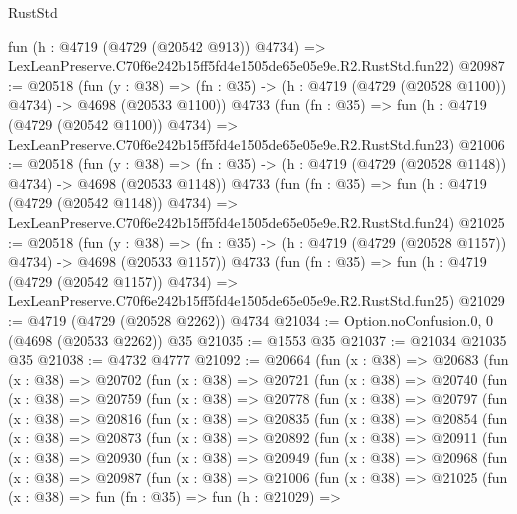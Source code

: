 \begin{lexlean}{RustStd}
\begin{coremodule}
    fun (h : @4719 (@4729 (@20542 @913)) @4734) =>
    LexLeanPreserve.C70f6e242b15ff5fd4e1505de65e05e9e.R2.RustStd.fun22)
@20987 := @20518
    (fun (y : @38) =>
    (fn : @35) -> (h : @4719 (@4729 (@20528 @1100)) @4734) -> @4698 (@20533 @1100))
    @4733
    (fun (fn : @35) =>
    fun (h : @4719 (@4729 (@20542 @1100)) @4734) =>
    LexLeanPreserve.C70f6e242b15ff5fd4e1505de65e05e9e.R2.RustStd.fun23)
@21006 := @20518
    (fun (y : @38) =>
    (fn : @35) -> (h : @4719 (@4729 (@20528 @1148)) @4734) -> @4698 (@20533 @1148))
    @4733
    (fun (fn : @35) =>
    fun (h : @4719 (@4729 (@20542 @1148)) @4734) =>
    LexLeanPreserve.C70f6e242b15ff5fd4e1505de65e05e9e.R2.RustStd.fun24)
@21025 := @20518
    (fun (y : @38) =>
    (fn : @35) -> (h : @4719 (@4729 (@20528 @1157)) @4734) -> @4698 (@20533 @1157))
    @4733
    (fun (fn : @35) =>
    fun (h : @4719 (@4729 (@20542 @1157)) @4734) =>
    LexLeanPreserve.C70f6e242b15ff5fd4e1505de65e05e9e.R2.RustStd.fun25)
@21029 := @4719 (@4729 (@20528 @2262)) @4734
@21034 := Option.noConfusion.{0, 0} (@4698 (@20533 @2262)) @35
@21035 := @1553 @35
@21037 := @21034 @21035 @35
@21038 := @4732 @4777
@21092 := @20664
    (fun (x : @38) =>
    @20683
      (fun (x : @38) =>
      @20702
        (fun (x : @38) =>
        @20721
          (fun (x : @38) =>
          @20740
            (fun (x : @38) =>
            @20759
              (fun (x : @38) =>
              @20778
                (fun (x : @38) =>
                @20797
                  (fun (x : @38) =>
                  @20816
                    (fun (x : @38) =>
                    @20835
                      (fun (x : @38) =>
                      @20854
                        (fun (x : @38) =>
                        @20873
                          (fun (x : @38) =>
                          @20892
                            (fun (x : @38) =>
                            @20911
                              (fun (x : @38) =>
                              @20930
                                (fun (x : @38) =>
                                @20949
                                  (fun (x : @38) =>
                                  @20968
                                    (fun (x : @38) =>
                                    @20987
                                      (fun (x : @38) =>
                                      @21006
                                        (fun (x : @38) =>
                                        @21025
                                          (fun (x : @38) =>
                                          fun (fn : @35) =>
                                          fun (h : @21029) =>

\end{coremodule}
\end{lexlean}
